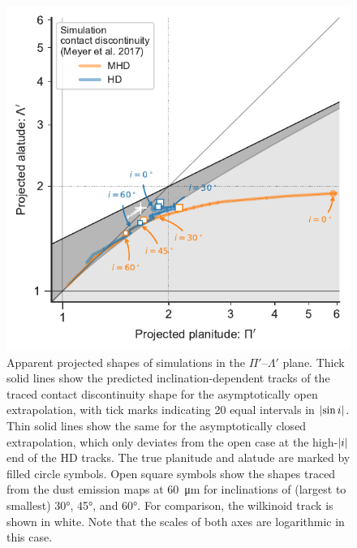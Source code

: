 \begin{figure}
  \centering
  \includegraphics[width=\linewidth]{figs/m17-planitude-alatude}
  \caption[]{Apparent projected shapes of simulations in the
    \(\Pi'\)--\(\Lambda'\) plane.  Thick solid lines show the predicted
    inclination-dependent tracks of the traced contact discontinuity
    shape for the asymptotically open extrapolation, with tick marks
    indicating 20 equal intervals in \(\lvert\sin i\rvert\). Thin solid
    lines show the same for the asymptotically closed extrapolation,
    which only deviates from the open case at the high-\(\lvert i\rvert\) end
    of the HD tracks.  The true planitude and alatude are marked by
    filled circle symbols.  Open square symbols show the shapes traced
    from the dust emission maps at \SI{60}{\um} for inclinations of
    (largest to smallest) \ang{30}, \ang{45}, and \ang{60}. For
    comparison, the wilkinoid track is shown in white. Note that the
    scales of both axes are logarithmic in this case.}
  \label{fig:sim-Pi-Lambda}
\end{figure}

